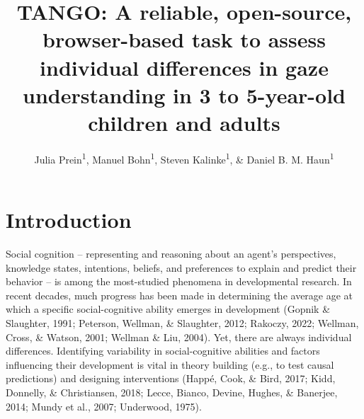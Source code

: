 \documentclass[
  man,floatsintext]{apa7}
\title{TANGO: A reliable, open-source, browser-based task to assess individual differences in gaze understanding in 3 to 5-year-old children and adults}
\author{Julia Prein\textsuperscript{1}, Manuel Bohn\textsuperscript{1}, Steven Kalinke\textsuperscript{1}, \& Daniel B. M. Haun\textsuperscript{1}}
\date{}
\affiliation{\vspace{0.5cm}\textsuperscript{1} Department of Comparative Cultural Psychology, Max Planck Institute for Evolutionary Anthropology, Leipzig, Germany}
\begin{document}
\maketitle

\hypertarget{introduction}{%
\section{Introduction}\label{introduction}}

Social cognition -- representing and reasoning about an agent's perspectives, knowledge states, intentions, beliefs, and preferences to explain and predict their behavior -- is among the most-studied phenomena in developmental research.
In recent decades, much progress has been made in determining the average age at which a specific social-cognitive ability emerges in development (Gopnik \& Slaughter, 1991; Peterson, Wellman, \& Slaughter, 2012; Rakoczy, 2022; Wellman, Cross, \& Watson, 2001; Wellman \& Liu, 2004).
Yet, there are always individual differences.
Identifying variability in social-cognitive abilities and factors influencing their development is vital in theory building (e.g., to test causal predictions) and designing interventions (Happé, Cook, \& Bird, 2017; Kidd, Donnelly, \& Christiansen, 2018; Lecce, Bianco, Devine, Hughes, \& Banerjee, 2014; Mundy et al., 2007; Underwood, 1975).
\end{document}
